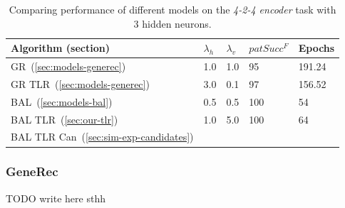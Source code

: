 \begin{table}[H] 
  \centering
    \begin{tabular}{|l|l|l|l|l|}
    \hline
    Algorithm (section)&$\lambda_h$&$\lambda_v$&$patSucc^F$ &Epochs\\ %
    \hline
    GR~(\ref{sec:models-generec}) &1.0 &1.0 &95&191.24\\ %
    \hline
    GR TLR~(\ref{sec:models-generec}) &3.0 &0.1 &97&156.52\\ %
    \hline
    BAL~(\ref{sec:models-bal})&0.5 &0.5 &100& 54\\ %
    \hline
    BAL TLR~(\ref{sec:our-tlr})&1.0& 5.0 & 100& 64\\ %
    \hline
    BAL TLR Can~(\ref{sec:sim-exp-candidates})& & & & \\ %
    \hline 
    \end{tabular}
  \caption{Comparing performance of different models on the \emph{4-2-4 encoder} task with 3 hidden neurons.} 
  \label{tab:results-cmp-auto4}
\end{table}







\subsubsection{GeneRec} 
TODO write here sthh

